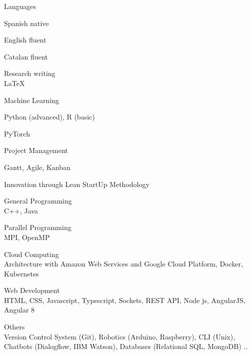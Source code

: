
\newpage
{}

\begin{multicols}{3}
    
    \cvskill
        {Languages} %
        {\begin{cvitems} %
        \vspace{-4mm}
        \item Spanish native
        \item English fluent
        \item Catalan fluent
        \end{cvitems}}
        
    \cvskill
        {Research writing} %
        {\\LaTeX}
        
    \cvskill
        {Machine Learning} %
        {\begin{cvitems} %
        \vspace{-4mm}
        \item Python (advanced), R (basic)  
        \item PyTorch
        \end{cvitems}}
        
    \columnbreak
    
    \cvskill
        {Project Management} %
        {\begin{cvitems} %
        \vspace{-5mm}
        \item Gantt, Agile, Kanban
        \item Innovation through Lean StartUp Methodology
        \end{cvitems}}
    
    \cvskill
        {General Programming} %
        {\\C++, Java}

    \cvskill
        {Parallel Programming} %
        {\\MPI, OpenMP}
        
    \columnbreak    
    
    \cvskill
        {Cloud Computing} %
        {\\Architecture with Amazon Web Services and Google Cloud Platform, Docker, Kubernetes}
        
    \cvskill
        {Web Development} %
        {\\HTML, CSS, Javascript, Typescript, Sockets, REST API, Node js, AngularJS, Angular 8}
        
    \cvskill
        {Others} %
        {\\Version Control System (Git), Robotics (Arduino, Raspberry), CLI (Unix), Chatbots (Dialogflow, IBM Watson), Databases (Relational SQL, MongoDB) ..}
\end{multicols}
    
    

